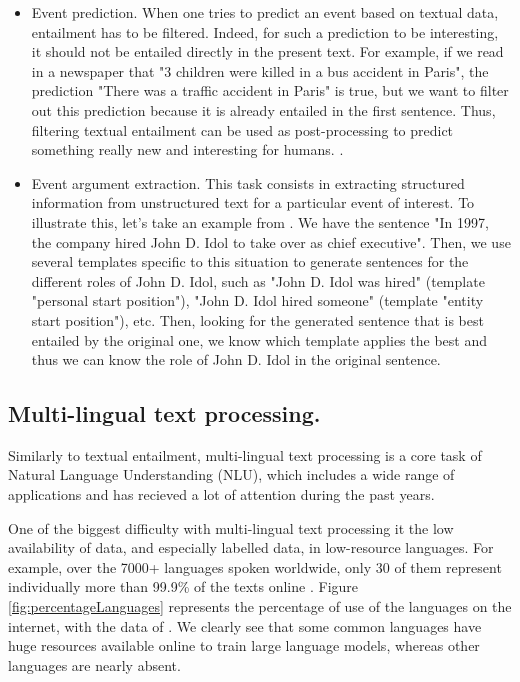 \documentclass[final]{cvpr}
\begin{document}
\begin{itemize}
    \item Event prediction. When one tries to predict an event based on textual data, entailment has to be filtered. Indeed, for such a prediction to be interesting, it should not be entailed directly in the present text. For example, if we read in a newspaper that "3 children were killed in a bus accident in Paris", the prediction "There was a traffic accident in Paris" is true, but we want to filter out this prediction because it is already entailed in the first sentence. Thus, filtering textual entailment can be used as post-processing to predict something really new and interesting for humans. \cite{Radinsky2013}.
    
    \item Event argument extraction. This task consists in extracting structured information from unstructured text for a particular event of interest. To illustrate this, let's take an example from \cite{Sainz2022}. We have the sentence "In 1997, the company hired John D. Idol to take over as chief executive". Then, we use several templates specific to this situation to generate sentences for the different roles of John D. Idol, such as "John D. Idol was hired" (template "personal start position"), "John D. Idol hired someone" (template "entity start position"), etc. Then, looking for the generated sentence that is best entailed by the original one, we know which template applies the best and thus we can know the role of John D. Idol in the original sentence.
\end{itemize}

\subsection{Multi-lingual text processing.}

Similarly to textual entailment, multi-lingual text processing is a core task of Natural Language Understanding (NLU), which includes a wide range of applications and has recieved a lot of attention during the past years.

One of the biggest difficulty with multi-lingual text processing it the low availability of data, and especially labelled data, in low-resource languages. For example, over the 7000+ languages spoken worldwide, only 30 of them represent individually more than 99.9\% of the texts online \cite{webLanguages}. Figure \ref{fig:percentageLanguages} represents the percentage of use of the languages on the internet, with the data of \cite{webLanguages}. We clearly see that some common languages have huge resources available online to train large language models, whereas other languages are nearly absent.
\end{document}
